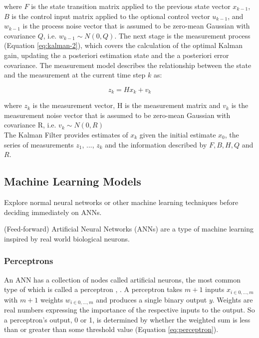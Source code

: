 where $F$ is the state transition matrix applied to the previous state vector $x_{k-1}$, $B$ is the control input matrix applied to the optional control vector $u_{k-1}$, and $w_{k-1}$ is the process noise vector that is assumed to be zero-mean Gaussian with covariance $Q$, i.e. $w_{k-1} \sim N(0, Q)$. The next stage is the measurement process (Equation \ref{eq:kalman-2}), which covers the calculation of the optimal Kalman gain, updating the a posteriori estimation state and the a posteriori error covariance. The measurement model describes the relationship between the state and the measurement at the current time step $k$ as:

\begin{equation}
\label{eq:kalman-2}
    z_k = Hx_k + v_k
\end{equation}

where $z_k$ is the measurement vector, H is the measurement matrix and $v_k$ is the measurement noise vector that is assumed to be zero-mean Gaussian with covariance R, i.e. $v_k \sim N(0, R)$ \\

The Kalman Filter provides estimates of $x_k$ given the initial estimate $x_0$, the series of measurements $z_1$, ..., $z_k$ and the information described by $F, B, H, Q$ and $R$. \\

\subsection{Machine Learning Models}
\label{section:ml-models-research}

Explore normal neural networks or other machine learning techniques before deciding immediately on ANNs.

(Feed-forward) Artificial Neural Networks (ANNs) are a type of machine learning inspired by real world biological neurons. 

\subsubsection{Perceptrons}

An ANN has a collection of nodes called artificial neurons, the most common type of which is called a perceptron \cite{methods-for-ds-slides}, \cite{neural-networks-book}. A perceptron takes $m + 1$ inputs $x_{i\in{0,...,m}}$ with $m + 1$ weights $w_{i\in{0,...,m}}$ and produces a single binary output $y$. Weights are real numbers expressing the importance of the respective inputs to the output. So a perceptron's output, 0 or 1, is determined by whether the weighted sum is less than or greater than some threshold value (Equation \ref{eq:perceptron}).

